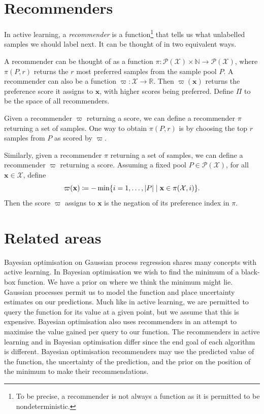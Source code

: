 \documentclass[11pt,twoside,openright]{report}
\newcommand\bbN{\mathbb{N}}
\newcommand\bbR{\mathbb{R}}
\newcommand\bx{\mathbf{x}}
\newcommand\cP{\mathcal{P}}
\newcommand\cX{\mathcal{X}}
\newcommand\abs[1]{\left|#1\right|}
\begin{document}
\section{Recommenders}

In active learning, a \textit{recommender} is a function\footnote{To be precise, a recommender is not always a function as it is permitted to be nondeterministic.} that tells us what unlabelled samples we should label next. It can be thought of in two equivalent ways.

A recommender can be thought of as a function $\pi : \cP(\cX) \times \bbN \to \cP(\cX)$, where $\pi(P, r)$ returns the $r$ most preferred samples from the sample pool $P$. A recommender can also be a function $\varpi : \cX \to \bbR$. Then $\varpi(\bx)$ returns the preference score it assigns to $\bx$, with higher scores being preferred. Define $\Pi$ to be the space of all recommenders.

Given a recommender $\varpi$ returning a score, we can define a recommender $\pi$ returning a set of samples. One way to obtain $\pi(P, r)$ is by choosing the top $r$ samples from $P$ as scored by $\varpi$.

Similarly, given a recommender $\pi$ returning a set of samples, we can define a recommender $\varpi$ returning a score. Assuming a fixed pool $P \in \cP(\cX)$, for all $\bx\in\cX$, define\[
  \varpi(\bx) \coloneqq -\min \{ i = 1, \dots, \abs{P} \mid \bx \in \pi(\cX, i)\} \text.
\] Then the score $\varpi$ assigns to $\bx$ is the negation of its preference index in $\pi$.


\section{Related areas}

Bayesian optimisation on Gaussian process regression shares many concepts with active learning. In Bayesian optimisation we wish to find the minimum of a black-box function. We have a prior on where we think the minimum might lie. Gaussian processes permit us to model the function and place uncertainty estimates on our predictions. Much like in active learning, we are permitted to query the function for its value at a given point, but we assume that this is expensive. Bayesian optimisation also uses recommenders in an attempt to maximise the value gained per query to our function. The recommenders in active learning and in Bayesian optimisation differ since the end goal of each algorithm is different. Bayesian optimisation recommenders may use the predicted value of the function, the uncertainty of the prediction, and the prior on the position of the minimum to make their recommendations. \citep{BayesianOptimisation} \citep{GPOptimisation} \citep{GPOptimisationBounds}
\end{document}
